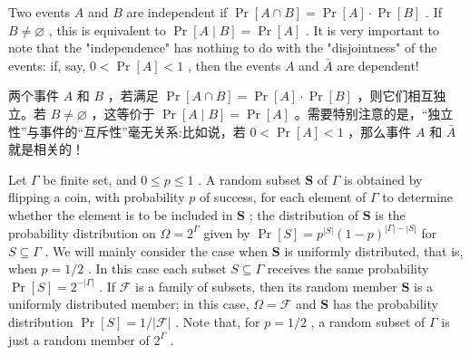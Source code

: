 \documentclass[10pt]{article}
\begin{document}
Two events \(A\) and \(B\) are independent if \(\Pr \left\lbrack  {A \cap  B}\right\rbrack   = \Pr \left\lbrack  A\right\rbrack   \cdot  \Pr \left\lbrack  B\right\rbrack\) . If \(B \neq  \varnothing\) , this is equivalent to \(\Pr \left\lbrack  {A \mid  B}\right\rbrack   = \Pr \left\lbrack  A\right\rbrack\) . It is very important to note that the "independence" has nothing to do with the "disjointness" of the events: if, say, \(0 < \Pr \left\lbrack  A\right\rbrack   < 1\) , then the events \(A\) and \(\bar{A}\) are dependent!

\begin{tcolorbox}\relax
两个事件 \(A\) 和 \(B\) ，若满足 \(\Pr \left\lbrack  {A \cap  B}\right\rbrack   = \Pr \left\lbrack  A\right\rbrack   \cdot  \Pr \left\lbrack  B\right\rbrack\) ，则它们相互独立。若 \(B \neq  \varnothing\) ，这等价于 \(\Pr \left\lbrack  {A \mid  B}\right\rbrack   = \Pr \left\lbrack  A\right\rbrack\) 。需要特别注意的是，“独立性”与事件的“互斥性”毫无关系:比如说，若 \(0 < \Pr \left\lbrack  A\right\rbrack   < 1\) ，那么事件 \(A\) 和 \(\bar{A}\) 就是相关的！
\end{tcolorbox}

Let \(\Gamma\) be finite set, and \(0 \leq  p \leq  1\) . A random subset \(\mathbf{S}\) of \(\Gamma\) is obtained by flipping a coin, with probability \(p\) of success, for each element of \(\Gamma\) to determine whether the element is to be included in \(\mathbf{S}\) ; the distribution of \(\mathbf{S}\) is the probability distribution on \(\Omega  = {2}^{\Gamma }\) given by \(\Pr \left\lbrack  S\right\rbrack   = {p}^{\left| S\right| }{\left( 1 - p\right) }^{\left| \Gamma \right|  - \left| S\right| }\) for \(S \subseteq  \Gamma\) . We will mainly consider the case when \(\mathbf{S}\) is uniformly distributed, that is, when \(p = 1/2\) . In this case each subset \(S \subseteq  \Gamma\) receives the same probability \(\Pr \left\lbrack  S\right\rbrack   = {2}^{-\left| \Gamma \right| }\) . If \(\mathcal{F}\) is a family of subsets, then its random member \(\mathbf{S}\) is a uniformly distributed member; in this case, \(\Omega  = \mathcal{F}\) and \(\mathbf{S}\) has the probability distribution \(\Pr \left\lbrack  S\right\rbrack   = 1/\left| \mathcal{F}\right|\) . Note that, for \(p = 1/2\) , a random subset of \(\Gamma\) is just a random member of \({2}^{\Gamma }\) .
\end{document}
